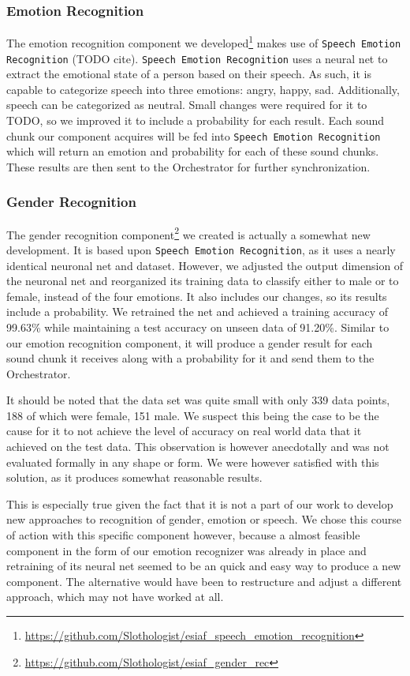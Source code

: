 \subsubsection{Emotion Recognition}
\label{main:components:emotion}
The emotion recognition component we developed\footnote{\url{https://github.com/Slothologist/esiaf_speech_emotion_recognition}} makes use of \texttt{Speech Emotion Recognition} (TODO cite). %
\texttt{Speech Emotion Recognition} uses a neural net to extract the emotional state of a person based on their speech.
As such, it is capable to categorize speech into three emotions: angry, happy, sad.
Additionally, speech can be categorized as neutral.
Small changes were required for it to TODO, so we improved it to include a probability for each result. %
Each sound chunk our component acquires will be fed into \texttt{Speech Emotion Recognition} which will return an emotion and probability for each of these sound chunks.
These results are then sent to the Orchestrator for further synchronization.

\subsubsection{Gender Recognition}
\label{main:components:gender}
The gender recognition component\footnote{\url{https://github.com/Slothologist/esiaf_gender_rec}} we created is actually a somewhat new development.
It is based upon \texttt{Speech Emotion Recognition}, as it uses a nearly identical neuronal net and dataset.
However, we adjusted the output dimension of the neuronal net and reorganized its training data to classify either to male or to female, instead of the four emotions.
It also includes our changes, so its results include a probability.
We retrained the net and achieved a training accuracy of 99.63\% while maintaining a test accuracy on unseen data of 91.20\%.
Similar to our emotion recognition component, it will produce a gender result for each sound chunk it receives along with a probability for it and send them to the Orchestrator.

It should be noted that the data set was quite small with only 339 data points, 188 of which were female, 151 male. 
We suspect this being the case to be the cause for it to not achieve the level of accuracy on real world data that it achieved on the test data.
This observation is however anecdotally and was not evaluated formally in any shape or form.
We were however satisfied with this solution, as it produces somewhat reasonable results.

This is especially true given the fact that it is not a part of our work to develop new approaches to recognition of gender, emotion or speech.
We chose this course of action with this specific component however, because a almost feasible component in the form of our emotion recognizer was already in place and retraining of its neural net seemed to be an quick and easy way to produce a new component.
The alternative would have been to restructure and adjust
a different approach, which may not have worked at all.







